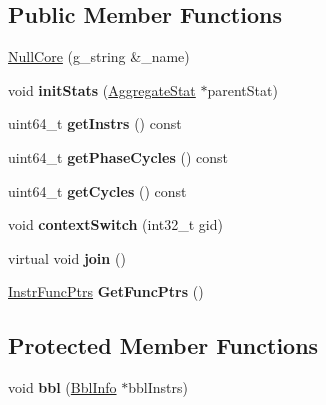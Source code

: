 \subsection*{Public Member Functions}
\begin{DoxyCompactItemize}
\item 
\hyperlink{classNullCore_a5ff75e3d1ab734fdf99a60ec3fcf339a}{Null\-Core} (g\-\_\-string \&\-\_\-name)
\item 
\hypertarget{classNullCore_a3cadc32e2edbce65f893d24468dd8bdf}{void {\bfseries init\-Stats} (\hyperlink{classAggregateStat}{Aggregate\-Stat} $\ast$parent\-Stat)}\label{classNullCore_a3cadc32e2edbce65f893d24468dd8bdf}

\item 
\hypertarget{classNullCore_ae97e480ddfaf99874fc480fc2c54cf33}{uint64\-\_\-t {\bfseries get\-Instrs} () const }\label{classNullCore_ae97e480ddfaf99874fc480fc2c54cf33}

\item 
\hypertarget{classNullCore_a76688318cc316e0e67d46ef64a61900f}{uint64\-\_\-t {\bfseries get\-Phase\-Cycles} () const }\label{classNullCore_a76688318cc316e0e67d46ef64a61900f}

\item 
\hypertarget{classNullCore_a9094cf29201bcc8e4da303c7563a7256}{uint64\-\_\-t {\bfseries get\-Cycles} () const }\label{classNullCore_a9094cf29201bcc8e4da303c7563a7256}

\item 
\hypertarget{classNullCore_a37e0ddd3bc6cfac1e6e60a8192450f1b}{void {\bfseries context\-Switch} (int32\-\_\-t gid)}\label{classNullCore_a37e0ddd3bc6cfac1e6e60a8192450f1b}

\item 
\hypertarget{classNullCore_a684c69e7e88f66642fb171c21185665f}{virtual void {\bfseries join} ()}\label{classNullCore_a684c69e7e88f66642fb171c21185665f}

\item 
\hypertarget{classNullCore_a158673562bc43cd3e25be911b212cdfb}{\hyperlink{structInstrFuncPtrs}{Instr\-Func\-Ptrs} {\bfseries Get\-Func\-Ptrs} ()}\label{classNullCore_a158673562bc43cd3e25be911b212cdfb}

\end{DoxyCompactItemize}
\subsection*{Protected Member Functions}
\begin{DoxyCompactItemize}
\item 
\hypertarget{classNullCore_a85a4f1a2b9e2060751889d65cba34300}{void {\bfseries bbl} (\hyperlink{structBblInfo}{Bbl\-Info} $\ast$bbl\-Instrs)}\label{classNullCore_a85a4f1a2b9e2060751889d65cba34300}

\end{DoxyCompactItemize}
